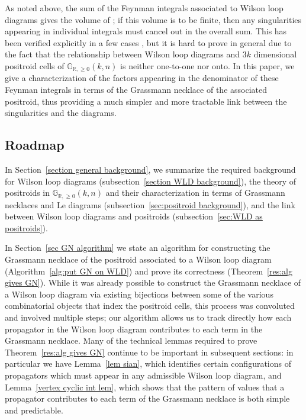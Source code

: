 \documentclass[11pt]{article}
\newcommand{\hlfix}[2]{\texthl{#1}\todo{#2}}
\newcommand{\R}{\mathbb{R}}
\newcommand{\Gr}{\mathbb{G}_{\R, \geq 0}}
\theoremstyle{remark}
\theoremstyle{definition}
\begin{document}
As noted above, the sum of the Feynman integrals associated to Wilson loop diagrams gives the volume of \hlfix{the space}{help?}; if this volume is to be finite, then any singularities appearing in individual integrals must cancel out in the overall sum. This has been verified explicitly in a few cases \cite{casestudy, HeslopStewart}, but it is hard to prove in general due to the fact that the relationship between Wilson loop diagrams and $3k$ dimensional positroid cells of $\Gr(k,n)$ is neither one-to-one nor onto. In this paper, we give a characterization of the factors appearing in the denominator of these Feynman integrals in terms of the Grassmann necklace of the associated positroid, thus providing a much simpler and more tractable link between the singularities and the diagrams. 


\subsection{Roadmap}

In Section~\ref{section general background}, we summarize the required background for Wilson loop diagrams (subsection~\ref{section WLD background}), the theory of positroids in $\Gr(k,n)$ and their characterization in terms of Grassmann necklaces and Le diagrams (subsection~\ref{sec:positroid background}), and the link between Wilson loop diagrams and positroids (subsection~\ref{sec:WLD as positroids}).

In Section~\ref{sec GN algorithm} we state an algorithm for constructing the Grassmann necklace of the positroid associated to a Wilson loop diagram (Algorithm~\ref{alg:put GN on WLD}) and prove its correctness (Theorem~\ref{res:alg gives GN}). While it was already possible to construct the Grassmann necklace of a Wilson loop diagram via existing bijections between some of the various combinatorial objects that index the positroid cells, this process was convoluted and involved multiple steps; our algorithm allows us to track directly how each propagator in the Wilson loop diagram contributes to each term in the Grassmann necklace. Many of the technical lemmas required to prove Theorem~\ref{res:alg gives GN} continue to be important in subsequent sections: in particular we have Lemma~\ref{lem sian}, which identifies certain configurations of propagators which must appear in any admissible Wilson loop diagram, and Lemma~\ref{vertex cyclic int lem}, which shows that the pattern of values that a propagator contributes to each term of the Grassmann necklace is both simple and predictable.
\end{document}
